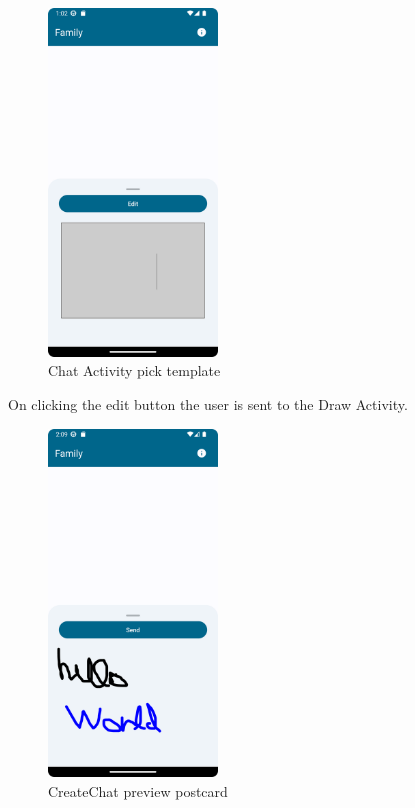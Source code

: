 \begin{figure}[!ht]
	\centering
	\includegraphics[trim={0cm -3cm 0 -3cm}, width=0.4\textwidth]{./Chapter6/Figures/ChatActivityPickPostcard}
	\caption{Chat Activity pick template}
	\label{fig:CVA3}
\end{figure}

On clicking the edit button the user is sent to the Draw Activity.

\begin{figure}[!ht]
	\centering
	\includegraphics[trim={0cm -3cm 0 -3cm}, width=0.4\textwidth]{./Chapter6/Figures/ChatActivityPreview}
	\caption{CreateChat preview postcard}
	\label{fig:CVA4}
\end{figure}


